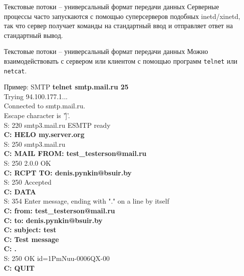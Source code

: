 \begin{frame}{Текстовые потоки -- универсальный формат передачи данных}
	Серверные процессы часто запускаются с помощью суперсерверов подобных inetd/xinetd,  так что сервер получает команды на стандартный ввод и отправляет ответ на стандартный вывод.
\end{frame}

\begin{frame}{Текстовые потоки -- универсальный формат передачи данных}
	Можно взаимодействовать с сервером или клиентом с помощью программ {\tt telnet} или {\tt netcat}.
\end{frame}

\begin{frame}{Пример: SMTP}
\scriptsize
	{\bfseries telnet smtp.mail.ru 25}\\
	\color{gray}
	Trying 94.100.177.1...\\
	Connected to smtp.mail.ru.\\
	Escape character is '\^]'.\\
	\color{black}
	S: 220 smtp3.mail.ru ESMTP ready\\
	{\bfseries C: HELO my.server.org}\\
	S: 250 smtp3.mail.ru\\
	{\bfseries C: MAIL FROM: test\_testerson@mail.ru}\\
	S: 250 2.0.0 OK\\
	{\bfseries C: RCPT TO: denis.pynkin@bsuir.by}\\
	S: 250 Accepted\\
	{\bfseries C: DATA}\\
	S: 354 Enter message,  ending with "." on a line by itself\\
	{\bfseries C: from: test\_testerson@mail.ru\\
	C: to: denis.pynkin@bsuir.by\\
	C: subject: test\\
	C: Test message\\
	C: .}\\
	S: 250 OK id=1PmNuu-0006QX-00\\
	{\bfseries C: QUIT}
\normalsize
\end{frame}



